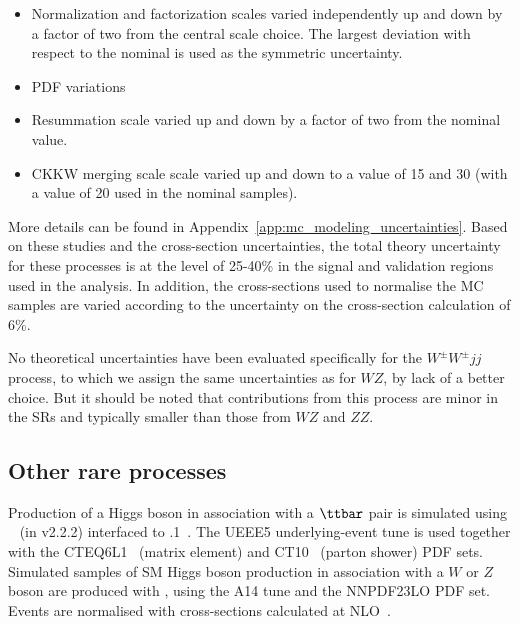 \begin{itemize}
\item Normalization and factorization scales varied independently up and down by a factor of two from the central scale choice. The largest deviation with respect to the nominal is used as the symmetric uncertainty.
\item PDF variations
\item Resummation scale varied up and down by a factor of two from the nominal value.
\item CKKW merging scale scale varied up and down to a value of 15 and 30 \GeV (with a value of 20 \GeV used in the nominal samples).
\end{itemize}

More details can be found in Appendix~\ref{app:mc_modeling_uncertainties}. 
Based on these studies and the cross-section uncertainties, the total theory uncertainty for these processes is at the level of 25-40\% in the signal and validation regions used in the analysis. In addition, the cross-sections used to normalise the MC samples are varied according to the uncertainty on the cross-section calculation of 6\%.

No theoretical uncertainties have been evaluated specifically for the $W^\pm W^\pm jj$ process, 
to which we assign the same uncertainties as for $WZ$, by lack of a better choice. 
But it should be noted that contributions from this process are minor in the SRs and typically  
smaller than those from $WZ$ and $ZZ$.

\subsection{Other rare processes}
\label{subsec:promptbkg_rare}

Production of a Higgs boson in association with a $\ttbar$ pair is simulated using \AMCATNLO~\cite{Alwall:2014hca} 
(in \MADGRAPH v2.2.2) interfaced to .1~\cite{Corcella:2000bw}.  
The UEEE5 underlying-event tune is used together with the CTEQ6L1~\cite{Pumplin:2002vw} (matrix element) and CT10~\cite{Lai:2010vv} (parton shower) PDF sets.
Simulated samples of SM Higgs boson production in association with a $W$ or $Z$ boson are produced with , using the \textsc{A14} tune and the \textsc{NNPDF23LO} PDF set. Events are normalised with cross-sections calculated at NLO~\cite{Dittmaier:2012vm}. 

